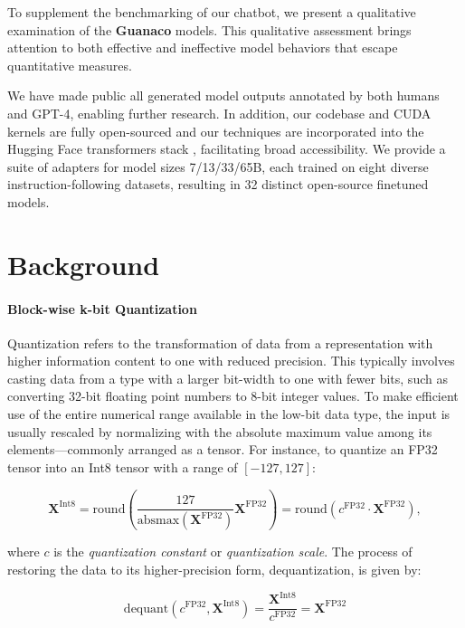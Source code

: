 To supplement the benchmarking of our chatbot, we present a qualitative examination of the \textbf{Guanaco} models. This qualitative assessment brings attention to both effective and ineffective model behaviors that escape quantitative measures.

We have made public all generated model outputs annotated by both humans and GPT-4, enabling further research. In addition, our codebase and CUDA kernels are fully open-sourced and our techniques are incorporated into the Hugging Face transformers stack \citep{wolf2019huggingface}, facilitating broad accessibility. We provide a suite of adapters for model sizes 7/13/33/65B, each trained on eight diverse instruction-following datasets, resulting in 32 distinct open-source finetuned models.

\section{Background}
\paragraph{Block-wise k-bit Quantization} 
Quantization refers to the transformation of data from a representation with higher information content to one with reduced precision. This typically involves casting data from a type with a larger bit-width to one with fewer bits, such as converting 32-bit floating point numbers to 8-bit integer values. To make efficient use of the entire numerical range available in the low-bit data type, the input is usually rescaled by normalizing with the absolute maximum value among its elements—commonly arranged as a tensor. For instance, to quantize an FP32 tensor into an Int8 tensor with a range of $[-127, 127]$:

\begin{equation}
    \mathbf{X}^{ \text{Int8}} = \text{round}\left( \frac{127}{{\text{absmax}}(\mathbf{X}^{{\text{FP32}}})}\mathbf{X}^{{\text{FP32}}} \right) = \text{round}(c^{\text{FP32}}\cdot \mathbf{X}^{{\text{FP32}}}),
\end{equation}

where $c$ is the {\em quantization constant} or {\em quantization scale}. The process of restoring the data to its higher-precision form, dequantization, is given by:

\begin{equation}
    \text{dequant}(c^{\text{FP32}}, \mathbf{X}^{\text{Int8}}) = \frac{\mathbf{X}^{\text{Int8}}}{c^{\text{FP32}}} = \mathbf{X}^{\text{FP32}}
\end{equation}


